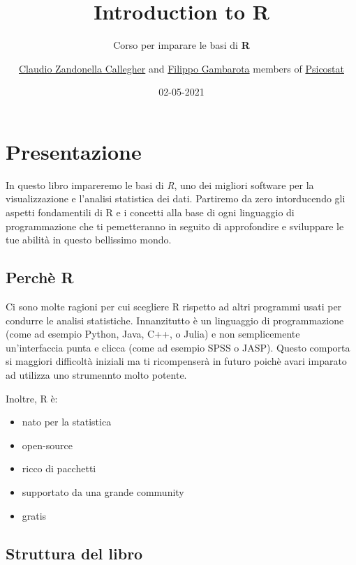 \documentclass[
]{book}
\title{{Introduction to R}}
\subtitle{Corso per imparare le basi di \textbf{R}}
\author{\href{https://claudiozandonella.netlify.app/}{Claudio Zandonella Callegher} and \href{https://filippogambarota.netlify.app/}{Filippo Gambarota} members of \href{https://psicostat.dpss.psy.unipd.it/}{Psicostat}}
\date{02-05-2021}
\providecommand{\tightlist}{%
  \setlength{\itemsep}{0pt}\setlength{\parskip}{0pt}}
\begin{document}
\maketitle

{
\setcounter{tocdepth}{1}
\tableofcontents
}
\hypertarget{presentazione}{%
\chapter*{Presentazione}\label{presentazione}}

In questo libro impareremo le basi di \emph{R}, uno dei migliori software per la visualizzazione e l'analisi statistica dei dati. Partiremo da zero intorducendo gli aspetti fondamentili di R e i concetti alla base di ogni linguaggio di programmazione che ti pemetteranno in seguito di approfondire e sviluppare le tue abilità in questo bellissimo mondo.

\hypertarget{perchuxe8-r}{%
\section*{Perchè R}\label{perchuxe8-r}}

Ci sono molte ragioni per cui scegliere R rispetto ad altri programmi usati per condurre le analisi statistiche. Innanzitutto è un linguaggio di programmazione (come ad esempio Python, Java, C++, o Julia) e non semplicemente un'interfaccia punta e clicca (come ad esempio SPSS o JASP). Questo comporta si maggiori difficoltà iniziali ma ti ricompenserà in futuro poichè avari imparato ad utilizza uno strumennto molto potente.

Inoltre, R è:

\begin{itemize}
\tightlist
\item
  nato per la statistica
\item
  open-source
\item
  ricco di pacchetti
\item
  supportato da una grande community
\item
  gratis
\end{itemize}

\hypertarget{struttura-del-libro}{%
\section*{Struttura del libro}\label{struttura-del-libro}}
\end{document}
